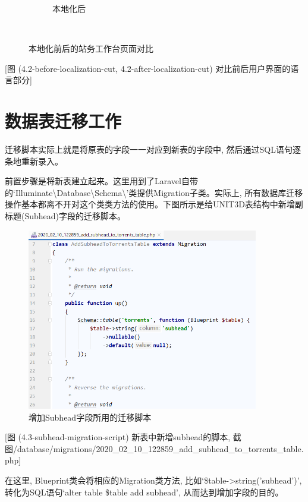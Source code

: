 \begin{figure}[h]
\begin{subfigure}{0.3\textwidth}
        \caption{本地化后}
        \label{fig:afterlocal}
    \end{subfigure} \\
    \caption{本地化前后的站务工作台页面对比}
    \label{fig:guidifflocal}
\end{figure}

[图 (4.2-before-localization-cut, 4.2-after-localization-cut) 对比前后用户界面的语言部分]


\section{数据表迁移工作}
\label{sec:migration}

迁移脚本实际上就是将原表的字段一一对应到新表的字段中, 然后通过SQL语句逐条地重新录入。

前置步骤是将新表建立起来。这里用到了Laravel自带的`Illuminate\textbackslash Database\textbackslash Sche\-ma\textbackslash'类提供Migration子类。实际上, 所有数据库迁移操作基本都离不开对这个类类方法的使用。下图所示是给UNIT3D表结构中新增副标题(Subhead)字段的迁移脚本。

\begin{figure}[ht]
    \centering
    \includegraphics[width=0.9\textwidth]{support-files/4.3-subhead-migration-script.png}
    \caption{增加Subhead字段所用的迁移脚本}
    \label{fig:subheadmigratescript}
\end{figure}

[图 (4.3-subhead-migration-script) 新表中新增subhead的脚本, 截图/database/migrations/2020\_02\_10\_122859\_add\_subhead\_to\_torrents\_table.php]

在这里, Blueprint类会将相应的Migration类方法, 比如`\$table->string('subhead')', 转化为SQL语句`alter table \$table add subhead', 从而达到增加字段的目的。


